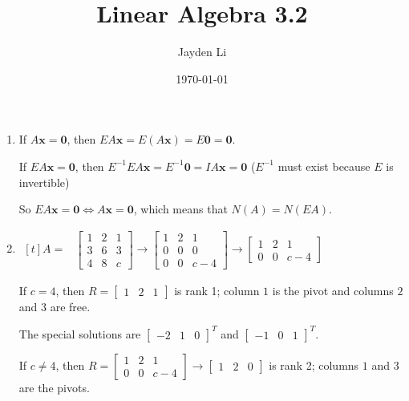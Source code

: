 \documentclass{article}
\title{\vspace*{-30pt}Linear Algebra 3.2}
\author{Jayden Li}
\date{\today}
\begin{document}
\fontsize{12pt}{12pt}\selectfont
\setlength{\abovedisplayskip}{0pt}
\maketitle
\begin{enumerate}
	\item
		If $A\mathbf x=\mathbf0$, then $EA\mathbf x=E(A\mathbf x)=E\mathbf0=\mathbf0$.

		If $EA\mathbf x=\mathbf 0$, then $E^{-1}EA \mathbf{x}=E^{-1}\mathbf{0}=IA\mathbf x=\mathbf 0$ ($E^{-1}$ must exist because $E$ is invertible)

		So $EA\mathbf x=\mathbf 0\iff A\mathbf x=\mathbf 0$, which means that $N(A)=N(EA)$.

	\item
		$\begin{aligned}[t]
			A=&\begin{bmatrix}
				1 & 2 & 1 \\
				3 & 6 & 3 \\
				4 & 8 & c
		    \end{bmatrix}\to
			\begin{bmatrix}
				1 & 2 & 1 \\
				0 & 0 & 0 \\
				0 & 0 & c-4
		    \end{bmatrix}\to
			\begin{bmatrix}
				1 & 2 & 1 \\
				0 & 0 & c-4
		    \end{bmatrix}
		\end{aligned}$
		
		If $c=4$, then $R=\begin{bmatrix}
			1 & 2 & 1 
		\end{bmatrix}$ is rank 1; column $1$ is the pivot and columns $2$ and $3$ are free.

		The special solutions are $\begin{bmatrix} -2 & 1 & 0 \end{bmatrix}^T$ and $\begin{bmatrix} -1 & 0 & 1 \end{bmatrix}^T$.

		If $c\neq4$, then $R=\begin{bmatrix}
			1 & 2 & 1 \\
			0 & 0 & c-4
		\end{bmatrix}\to
		\begin{bmatrix}
			1 & 2 & 0
		\end{bmatrix}$ is rank 2; columns $1$ and $3$ are the pivots.


\end{enumerate}
\end{document}
